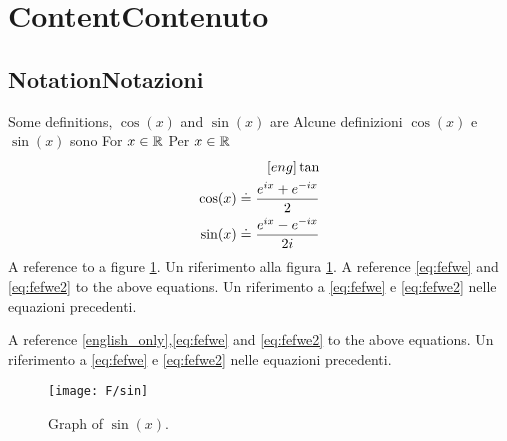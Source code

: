 \section{\ifCDLeng Content\fi \ifCDLita Contenuto\fi}

\subsection{\ifCDLeng Notation\fi \ifCDLita Notazioni\fi}

\begin{Defn}
  \label{defn:1}
  \CDLeng Some definitions, $\cos(x)$ and \(\sin(x)\) are
  \CDLita Alcune definizioni $\cos(x)$ e \(\sin(x)\) sono
  \CDLeng For \(x\in{\mathbb{R}}\)
  \CDLeng Per \(x\in{\mathbb{R}}\)
  \begin{eqnarray}
    [eng] \tan \label{english_only}\\
    \cos(x) \doteq \frac{e^{ix}+e^{-ix}}{2}  \label{eq:fefwe} \\
    \sin(x) \doteq \frac{e^{ix}-e^{-ix}}{2i} \label{eq:fefwe2}
  \end{eqnarray}
  \CDLeng A reference to a figure \ref{fig:a354}.
  \CDLita Un riferimento alla figura   \ref{fig:a354}.
  \CDLeng A reference \eqref{eq:fefwe} and  \eqref{eq:fefwe2} to the above equations.
  \CDLita Un riferimento a \eqref{eq:fefwe} e  \eqref{eq:fefwe2} nelle equazioni precedenti.
\end{Defn}

\CDLeng A reference \eqref{english_only},\eqref{eq:fefwe} and  \eqref{eq:fefwe2} to the above equations.
\CDLita Un riferimento a \eqref{eq:fefwe} e  \eqref{eq:fefwe2} nelle equazioni precedenti.


\begin{figure}[ht]\label{fig:a354}
  \begin{center}
    \texttt{[image: F/sin]}
    \caption{Graph of \(\sin(x)\).}
  \end{center}
\end{figure}




